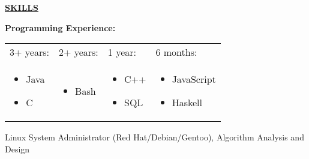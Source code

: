 \documentclass[letter,11pt]{article}
\begin{document}
\begin{center}
  \vspace{-\topsep}
  \underline{\textbf{SKILLS}}
\end{center}

\noindent
\vspace{-\topsep}
\textbf{Programming Experience:}
\begin{center}
  \begin{tabular}{@{}p{}p{}p{}p{}@{}}
  3+ years: & 2+ years: & 1 year: & 6 months: \\
  \vspace{-\topsep} \begin{itemize}[noitemsep,topsep=0pt,leftmargin=6mm]
  \item Java
  \item C
  \end{itemize}
  &
  \vspace{-\topsep} \begin{itemize}[noitemsep,topsep=0pt, leftmargin=6mm]
  \item Bash
  \end{itemize}
  &
  \vspace{-\topsep} \begin{itemize}[noitemsep,topsep=0pt, leftmargin=6mm]
  \item C++
  \item SQL
    
  \end{itemize}
  &
  \vspace{-\topsep} \begin{itemize}[noitemsep,topsep=0pt, leftmargin=6mm]
  \item JavaScript
  \item Haskell
  \end{itemize}
\end{tabular}
\end{center}
\begin{center}
  Linux System Administrator (Red Hat/Debian/Gentoo), Algorithm Analysis and Design
\end{center}
\end{document}
